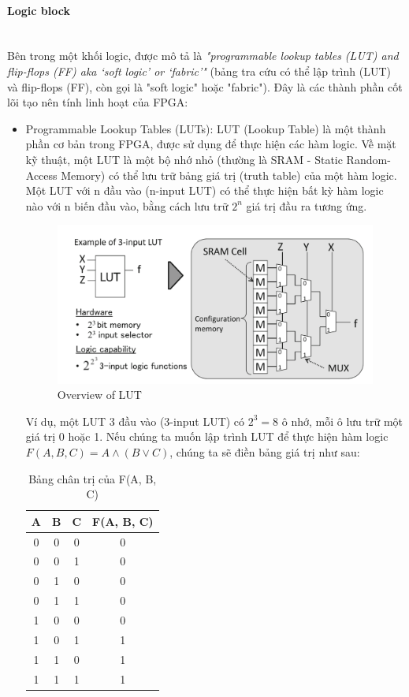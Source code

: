\documentclass[a4paper]{article}
\begin{document}
\paragraph{Logic block} \leavevmode\\
Bên trong một khối logic, được mô tả là \textit{"programmable lookup tables (LUT) and flip-flops (FF) aka ‘soft logic’ or ‘fabric’"} (bảng tra cứu có thể lập trình (LUT) và flip-flops (FF), còn gọi là "soft logic" hoặc "fabric"). Đây là các thành phần cốt lõi tạo nên tính linh hoạt của FPGA:
\begin{itemize}
    \item Programmable Lookup Tables (LUTs): LUT (Lookup Table) là một thành phần cơ bản trong FPGA, được sử dụng để thực hiện các hàm logic. Về mặt kỹ thuật, một LUT là một bộ nhớ nhỏ (thường là SRAM - Static Random-Access Memory) có thể lưu trữ bảng giá trị (truth table) của một hàm logic. Một LUT với n đầu vào (n-input LUT) có thể thực hiện bất kỳ hàm logic nào với n biến đầu vào, bằng cách lưu trữ \(2^n\) giá trị đầu ra tương ứng.
    \begin{figure}[H]
        \centering
        \includegraphics[width=0.75\linewidth]{assets/lut.png}
        \caption{Overview of LUT}
        \label{fig:enter-label}
    \end{figure}
    Ví dụ, một LUT 3 đầu vào (3-input LUT) có \(2^3 = 8\) ô nhớ, mỗi ô lưu trữ một giá trị 0 hoặc 1. Nếu chúng ta muốn lập trình LUT để thực hiện hàm logic \(F(A, B, C) = A \land (B \lor C)\), chúng ta sẽ điền bảng giá trị như sau:
    
    \begin{table}[h]
        \centering
        \begin{tabular}{|c|c|c|c|}
            \hline
            A & B & C & F(A, B, C) \\
            \hline
            0 & 0 & 0 & 0 \\
            0 & 0 & 1 & 0 \\
            0 & 1 & 0 & 0 \\
            0 & 1 & 1 & 0 \\
            1 & 0 & 0 & 0 \\
            1 & 0 & 1 & 1 \\
            1 & 1 & 0 & 1 \\
            1 & 1 & 1 & 1 \\
            \hline
        \end{tabular}
        \caption{Bảng chân trị của F(A, B, C)}
        \label{tab:truth_table}
    \end{table}
    

\end{itemize}
\end{document}
